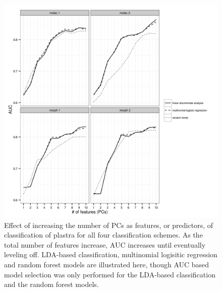 \documentclass[12pt,letterpaper]{article}\usepackage{graphicx, color}
\begin{document}
\begin{figure}[ht]
  \centering
  \includegraphics[width = \textwidth]{figure/roc_sel}
  \caption{Effect of increasing the number of PCs as features, or predictors, of classification of plastra for all four classification schemes. As the total number of features increase, AUC increases until eventually leveling off. LDA-based classification, multinomial logisitic regression and random forest models are illustrated here, though AUC based model selection was only performed for the LDA-based classification and the random forest models.}
  \label{fig:roc}
\end{figure}
\end{document}
